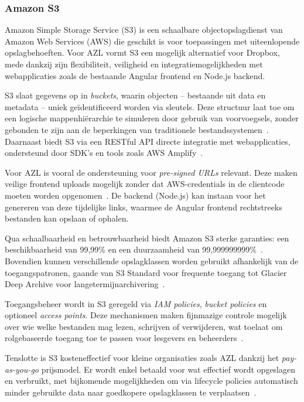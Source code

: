 \subsubsection{Amazon S3}
Amazon Simple Storage Service (S3) is een schaalbare objectopslagdienst van Amazon Web Services (AWS) die geschikt is voor toepassingen met uiteenlopende opslagbehoeften. Voor AZL vormt S3 een mogelijk alternatief voor Dropbox, mede dankzij zijn flexibiliteit, veiligheid en integratiemogelijkheden met webapplicaties zoals de bestaande Angular frontend en Node.js backend.

S3 slaat gegevens op in \textit{buckets}, waarin objecten – bestaande uit data en metadata – uniek geïdentificeerd worden via sleutels. Deze structuur laat toe om een logische mappenhiërarchie te simuleren door gebruik van voorvoegsels, zonder gebonden te zijn aan de beperkingen van traditionele bestandssystemen~\autocite{aws_docs_structuur}. Daarnaast biedt S3 via een RESTful API directe integratie met webapplicaties, ondersteund door SDK's en tools zoals AWS Amplify~\autocite{aws_docs_amplify}.

Voor AZL is vooral de ondersteuning voor \textit{pre-signed URLs} relevant. Deze maken veilige frontend uploads mogelijk zonder dat AWS-credentials in de clientcode moeten worden opgenomen~\autocite{aws_presigned}. De backend (Node.js) kan instaan voor het genereren van deze tijdelijke links, waarmee de Angular frontend rechtstreeks bestanden kan opslaan of ophalen.

Qua schaalbaarheid en betrouwbaarheid biedt Amazon S3 sterke garanties: een beschikbaarheid van 99,99\% en een duurzaamheid van 99,999999999\%~\autocite{aws_availability}. Bovendien kunnen verschillende opslagklassen worden gebruikt afhankelijk van de toegangspatronen, gaande van S3 Standard voor frequente toegang tot Glacier Deep Archive voor langetermijnarchivering~\autocite{aws_classes}.

Toegangsbeheer wordt in S3 geregeld via \textit{IAM policies}, \textit{bucket policies} en optioneel \textit{access points}. Deze mechanismen maken fijnmazige controle mogelijk over wie welke bestanden mag lezen, schrijven of verwijderen, wat toelaat om rolgebaseerde toegang toe te passen voor lesgevers en beheerders~\autocite{aws_accesscontrol}.

Tenslotte is S3 kosteneffectief voor kleine organisaties zoals AZL dankzij het \textit{pay-as-you-go} prijsmodel. Er wordt enkel betaald voor wat effectief wordt opgeslagen en verbruikt, met bijkomende mogelijkheden om via lifecycle policies automatisch minder gebruikte data naar goedkopere opslagklassen te verplaatsen~\autocite{aws_costs}.

